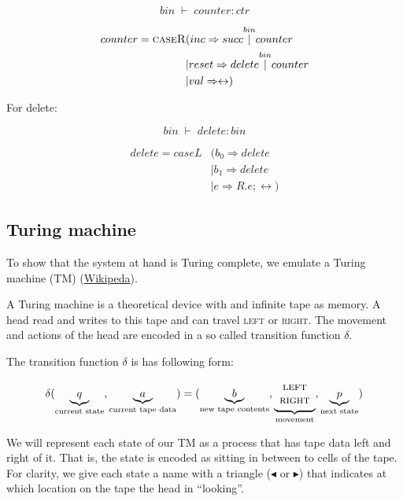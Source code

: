 \documentclass{article}
\begin{document}
	\[
	\; bin\; \vdash\; counter:ctr\; 
	\]
	
	
	\begin{align*}
	counter = \textsc{caseR}&( inc \Rightarrow succ \overset{bin}{\vert} counter \\
	&| reset \Rightarrow delete \overset{bin}{\vert} counter \\
	&| val \Rightarrow \leftrightarrow )
	\end{align*}
	
	For delete:
	
	\[
	\; bin\; \vdash\; delete:bin\; 
	\]
	
	\begin{align*}
	delete = caseL&( b_0 \Rightarrow delete \\
	&| b_1 \Rightarrow delete \\
	&| e \Rightarrow R . e; \leftrightarrow )
	\end{align*}
	
	\subsection{Turing machine}
	
	To show that the system at hand is Turing complete, we emulate a Turing machine (TM) (\href{https://en.wikipedia.org/wiki/Turing_machine}{Wikipeda}). 
	
	A Turing machine is a theoretical device with and infinite tape as memory. A head read and writes to this tape and can travel \textsc{left} or \textsc{right}. The movement and actions of the head are encoded in a so called transition function \(\delta\). 
	
	The transition function \(\delta\) is has following form:
	
	\[
	\delta(
	\underbrace{q}_{\text{current state}},
	\underbrace{a}_{\text{current tape data}}) =  (
	\underbrace{b}_{\text{new tape contents}}, 
	\underbrace{\begin{array}{c} \textsc{left}\\ \textsc{right} \end{array}}_{\text{movement}} ,
	\underbrace{p}_{\text{next state}}
	)
	\]
	
	We will represent each state of our TM as a process that has tape data left and right of it. That is, the state is encoded as sitting in between to cells of the tape. For clarity, we give each state a name with a triangle ($\blacktriangleleft$ or $\blacktriangleright$) that indicates at which location on the tape the head in ``looking''.
	
\end{document}
